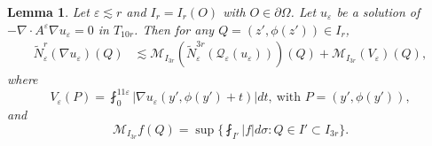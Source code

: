\documentclass[reqno,12pt]{amsart} %
\newtheorem{lemma}[theorem]{Lemma}
\theoremstyle{definition}
\theoremstyle{remark}
\numberwithin{equation}{section}
\newcommand{\M}{\mathcal{M}}
\newcommand{\Q}{\mathcal{Q}}
\newcommand{\e}{\varepsilon}
\begin{document}
\begin{lemma}\label{lem.NT.ptws}
    Let $\e \lesssim r$ and $I_r = I_r(O)$ with $O \in \partial \Omega$. Let $u_\e$ be a solution of $-\nabla\cdot A^\e \nabla u_\e = 0$ in $T_{10r}$.
    Then for any $Q = (z',\phi(z')) \in I_r$,
    \begin{equation}\label{est.NeDue.local}
    \begin{aligned}
        \widetilde{N}_\e^r(\nabla u_\e)(Q) &\lesssim \M_{I_{3r}} (\widetilde{N}_\e^{3r}(\Q_\e(u_\e)))(Q)  + \M_{I_{3r}} (V_\e)(Q),
    \end{aligned}
    \end{equation}
    where
\begin{equation}\label{def.VeP}
    V_\e(P) = \fint_{0}^{11\e} |\nabla u_\e(y',\phi(y') + t)| dt, \ \text{with } P = (y',\phi(y')),
\end{equation}
    and
    \begin{equation}\label{def.MI3r}
        \M_{I_{3r}}f(Q) = \sup \bigg\{ \fint_{I'} |f| d\sigma: Q\in I' \subset I_{3r}\bigg\}.
    \end{equation}
\end{lemma}
\end{document}
